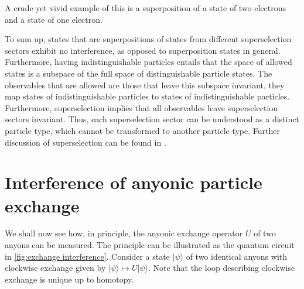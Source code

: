 A crude yet vivid example of this is a superposition of a state of two electrons and a state of one electron.

To sum up, states that are superpositions of states from different superselection sectors exhibit no interference, as opposed to superposition states in general. Furthermore, having indistinguishable particles entails that the space of allowed states is a subspace of the full space of distinguishable particle states. The observables that are allowed are those that leave this subspace invariant, they map states of indistinguishable particles to states of indistinguishable particles. Furthermore, superselection implies that all observables leave superselection sectors invariant. Thus, each superselection sector can be understood as a distinct particle type, which cannot be transformed to another particle type. Further discussion of superselection can be found in \cite{ballentine,preskill,kitaev}.





































\section{Interference of anyonic particle exchange}

We shall now see how, in principle, the anyonic exchange operator $U$ of two anyons can be measured. The principle can be illustrated as the quantum circuit in \cref{fig:exchange interference}. Consider a state $|ψ⟩$ of two identical anyons with clockwise exchange given by $|ψ⟩ ↦ U|ψ⟩$. Note that the loop describing clockwise exchange is unique up to homotopy.

